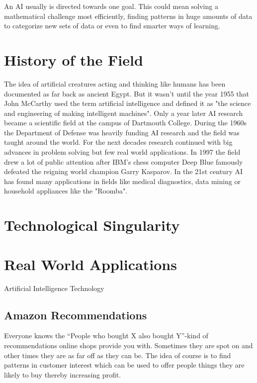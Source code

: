 An AI usually is directed towards one goal. This could mean solving a mathematical challenge most efficiently, finding patterns in huge amounts of data to categorize new sets of data or even to find smarter ways of learning.


\section{History of the Field}

The idea of artificial creatures acting and thinking like humans has been documented as far back as ancient Egypt. But it wasn't until the year 1955 that John McCarthy used the term artificial intelligence and defined it as "the science and engineering of making intelligent machines".
Only a year later AI research became a scientific field at the campus of Dartmouth College. During the 1960s the Department of Defense was heavily funding AI research and the field was taught around the world.
For the next decades research continued with big advances in problem solving but few real world applications. In 1997 the field drew a lot of public attention after IBM's chess computer Deep Blue famously defeated the reigning world champion Garry Kasparov.
In the 21st century AI has found many applications in fields like medical diagnostics, data mining or household appliances like the "Roomba". 

\section{Technological Singularity}

\newpage
\section{Real World Applications}

Artificial Intelligence Technology 

\subsection{Amazon Recommendations}
Everyone knows the ``People who bought X also bought Y''-kind of recommendations online shops provide you with. Sometimes they are spot on and other times they are as far off as they can be. The idea of course is to find patterns in customer interest which can be used to offer people things they are likely to buy thereby increasing profit.

